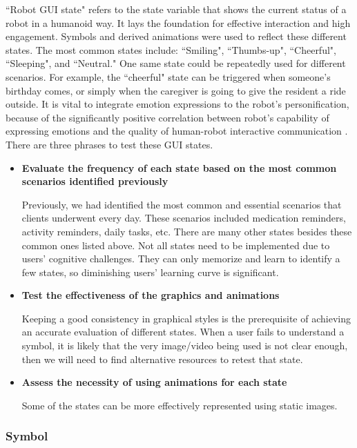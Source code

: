 \documentclass[letterpaper, 10 pt, conference]{ieeeconf}  %
\begin{document}
``Robot GUI state" refers to the state variable that shows the current status of a robot in a humanoid way. It lays the foundation for effective interaction and high engagement. Symbols and derived animations were used to reflect these different states. The most common states include: ``Smiling", ``Thumbs-up", ``Cheerful", ``Sleeping", and ``Neutral." One same state could be repeatedly used for different scenarios. For example, the ``cheerful" state can be triggered when someone's birthday comes, or simply when the caregiver is going to give the resident a ride outside. It is vital to integrate emotion expressions to the robot's personification, because of the significantly positive correlation between robot's capability of expressing emotions and the quality of human-robot interactive communication \cite{Leyzberg2011}. There are three phrases to test these GUI states.

\begin{itemize}
  \item {\textbf{Evaluate the frequency of each state based on the most common scenarios identified previously}}

  Previously, we had identified the most common and essential scenarios that clients underwent every day. These scenarios included medication reminders, activity reminders, daily tasks, etc. There are many other states besides these common ones listed above. Not all states need to be implemented due to users' cognitive challenges. They can only memorize and learn to identify a few states, so diminishing users' learning curve is significant.
  
  \item {\textbf{Test the effectiveness of the graphics and animations}}
 
Keeping a good consistency in graphical styles is the prerequisite of achieving an accurate evaluation of different states. When a user fails to understand a symbol, it is likely that the very image/video being used is not clear enough, then we will need to find alternative resources to retest that state.

  \item {\textbf{Assess the necessity of using animations for each state}}

Some of the states can be more effectively represented using static images.

\end{itemize}

\subsubsection{Symbol}
\end{document}
